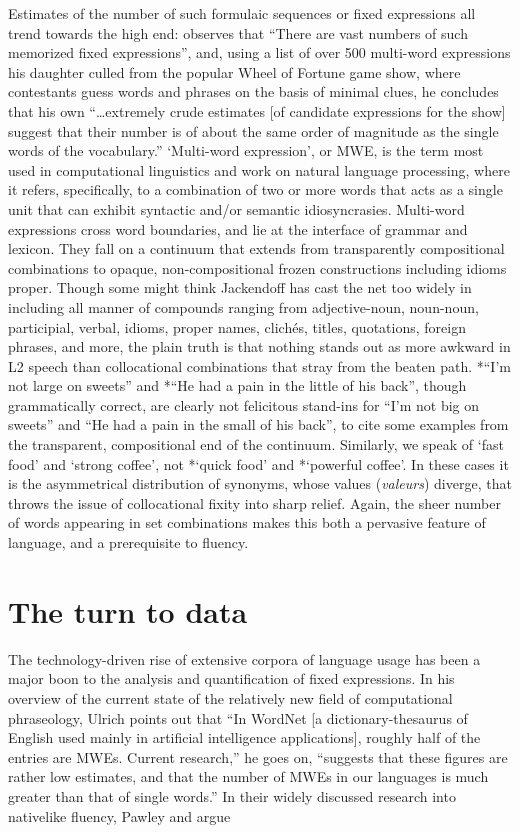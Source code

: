 \documentclass[output=paper]{langsci/langscibook}
\begin{document}
Estimates of the number of such formulaic sequences or fixed expressions all trend towards the high end: \citet[156]{jackendoff_architecture_1997} observes that “There are vast numbers of such memorized fixed expressions”, and, using a list of over 500 multi-word expressions his daughter culled from the popular Wheel of Fortune game show, where contestants guess words and phrases on the basis of minimal clues, he concludes that his own “…extremely crude estimates [of candidate expressions for the show] suggest that their number is of about the same order of magnitude as the single words of the vocabulary.” ‘Multi-word expression’, or MWE, is the term most used in computational linguistics and work on natural language processing, where it refers, specifically, to a combination of two or more words that acts as a single unit that can exhibit syntactic and/or semantic idiosyncrasies. Multi-word expressions cross word boundaries, and lie at the interface of grammar and lexicon. They fall on a continuum that extends from transparently compositional combinations to opaque, non-compositional frozen constructions including idioms proper. Though some might think Jackendoff has cast the net too widely in including all manner of compounds ranging from adjective-noun, noun-noun, participial, verbal, idioms, proper names, clichés, titles, quotations, foreign phrases, and more, the plain truth is that nothing stands out as more awkward in L2 speech than collocational combinations that stray from the beaten path. *“I’m not large on sweets” and *“He had a pain in the little of his back”, though grammatically correct, are clearly not felicitous stand-ins for “I’m not big on sweets” and “He had a pain in the small of his back”, to cite some examples from the transparent, compositional end of the continuum. Similarly, we speak of ‘fast food’ and ‘strong coffee’, not *‘quick food’ and *‘powerful coffee’. In these cases it is the asymmetrical distribution of synonyms, whose values (\textit{valeurs}) diverge, that throws the issue of collocational fixity into sharp relief. Again, the sheer number of words appearing in set combinations makes this both a pervasive feature of language, and a prerequisite to fluency. 

\section{The turn to data}

The technology-driven rise of extensive corpora of language usage has been a major boon to the analysis and quantification of fixed expressions. In his overview of the current state of the relatively new field of computational phraseology, Ulrich \citet[348]{granger_computational_2008} points out that “In WordNet [a dictionary-thesaurus of English used mainly in artificial intelligence applications], roughly half of the entries are MWEs. Current research,” he goes on, “suggests that these figures are rather low estimates, and that the number of MWEs in our languages is much greater than that of single words.” In their widely discussed research into nativelike fluency, Pawley and \citet[191--192]{richards_two_1983} argue 
\end{document}

